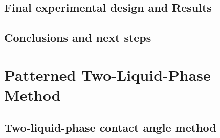 \documentclass[12pt,letterpaper]{report}
\begin{document}
\section{Final experimental design and Results}\label{section2-3}


\section{Conclusions and next steps}\label{section2-4}



%
%	

%


\chapter{Patterned Two-Liquid-Phase Method}\label{chapter3}


\section{Two-liquid-phase contact angle method}

\end{document}
